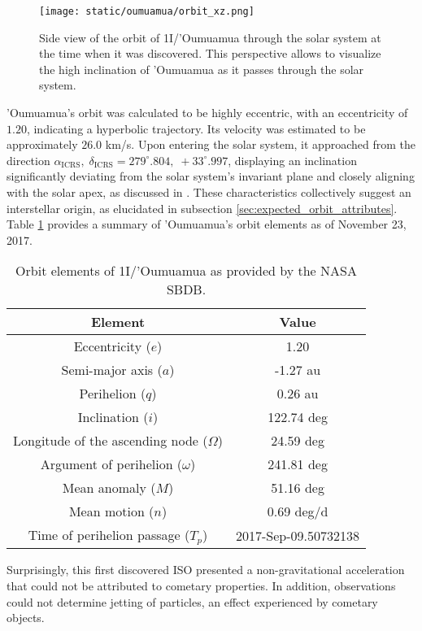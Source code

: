 \begin{figure}[H]
  \centering
  \texttt{[image: static/oumuamua/orbit\_xz.png]}
  \caption[Side view of the orbit of 1I/'Oumuamua through the solar system]{
    Side view of the orbit of 1I/'Oumuamua through the solar system at the time when it was
    discovered. This perspective allows to visualize the high inclination of
    'Oumuamua as it passes through the solar system.}
  \label{fig:oumuamua_orbit_xz}
\end{figure}

'Oumuamua's orbit was calculated to be highly eccentric, with an eccentricity of
$1.20$, indicating a hyperbolic trajectory. Its velocity was estimated to be
approximately $26.0$ km/s. Upon entering the solar system, it approached from
the direction $\alpha_{\text{ICRS}},\; \delta_{\text{ICRS}} = 279^\circ.804,\;
+33^\circ.997$, displaying an inclination significantly deviating from the solar
system's invariant plane and closely aligning with the solar apex, as discussed
in \cite{mamajek2017}. These characteristics collectively suggest an
interstellar origin, as elucidated in subsection
\ref{sec:expected_orbit_attributes}. Table \ref{tab:oumuamua_elements} provides
a summary of 'Oumuamua's orbit elements as of November 23, 2017.

\begin{table}[H]
  \centering
  \begin{tabular}{|c|c|}
    \hline
    Element & Value \\
    \hline
    Eccentricity ($e$) & 1.20 \\
    Semi-major axis ($a$) & -1.27 au \\
    Perihelion ($q$) & 0.26 au \\
    Inclination ($i$) & 122.74 deg \\
    Longitude of the ascending node ($\Omega$) & 24.59 deg \\
    Argument of perihelion ($\omega$) & 241.81 deg \\
    Mean anomaly ($M$) & 51.16 deg \\
    Mean motion ($n$) & 0.69 deg/d \\
    Time of perihelion passage ($T_p$) & 2017-Sep-09.50732138 \\
    \hline
  \end{tabular}
  \caption{Orbit elements of 1I/'Oumuamua as provided by the NASA SBDB.}
  \label{tab:oumuamua_elements}
\end{table}

Surprisingly, this first discovered ISO presented a non-gravitational
acceleration that could not be attributed to cometary properties. In addition,
observations could not determine jetting of particles, an effect experienced by
cometary objects.

